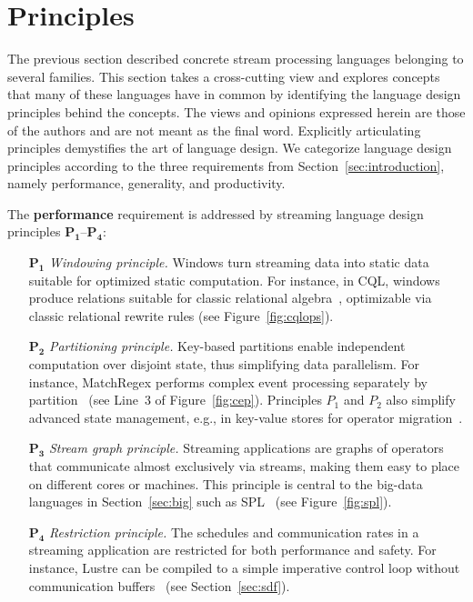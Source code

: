 \section{Principles}\label{sec:principles}

The previous section described concrete stream processing languages
belonging to several families. This section takes a cross-cutting view
and explores concepts that many of these languages have in common by
identifying the language design principles behind the concepts.
The views and opinions expressed herein are those of the authors and
are not meant as the final word.  Explicitly articulating principles
demystifies the art of language design. We categorize language design
principles according to the three requirements from
Section~\ref{sec:introduction}, namely performance, generality, and
productivity.

The \textbf{performance} requirement is addressed by streaming
language design principles $\mathbf{P_1}$--$\mathbf{P_4}$:
\begin{itemize}[leftmargin=6mm]
  \item[$\mathbf{P_1}$] \emph{Windowing principle.} Windows turn streaming
    data into static data suitable for optimized static computation.
    For instance, in CQL, windows produce relations suitable for
    classic relational algebra~\cite{arasu_babu_widom_2006},
    optimizable via classic relational rewrite rules (see
    Figure~\ref{fig:cqlops}).
  \item[$\mathbf{P_2}$] \emph{Partitioning principle.} Key-based partitions
    enable independent computation over disjoint state, thus
    simplifying data parallelism. %
    For instance, MatchRegex performs complex event processing separately by
    partition~\cite{hirzel_2012} (see Line~3 of Figure~\ref{fig:cep}).
    Principles $P_1$ and $P_2$ also simplify advanced state management, e.g.,
    in key-value stores for operator migration~\cite{gedik_et_al_2014}.
  \item[$\mathbf{P_3}$] \emph{Stream graph principle.} Streaming
    applications are graphs of operators that communicate almost
    exclusively via streams, making them easy to place on different
    cores or machines. This principle is central to the big-data
    languages in Section~\ref{sec:big} such as
    SPL~\cite{hirzel_schneider_gedik_2017} (see Figure~\ref{fig:spl}).
  \item[$\mathbf{P_4}$] \emph{Restriction principle.} The schedules and
    communication rates in a streaming application are restricted for
    both performance and safety. For instance, Lustre can be compiled
    to a simple imperative control loop without communication
    buffers~\cite{lustre_1987} (see Section~\ref{sec:sdf}).
\end{itemize}

